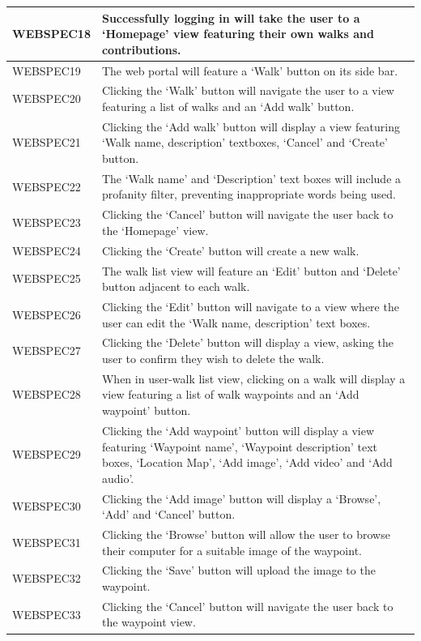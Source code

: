 \documentclass[11pt,a4paper]{article}
\begin{document}
\begin{longtable}{|p{2.5cm}p{13cm}|}
WEBSPEC18 & Successfully logging in will take the user to a `Homepage' view featuring their own walks and contributions. \\ \hline
WEBSPEC19 & The web portal will feature a `Walk' button on its side bar. \\ \hline
WEBSPEC20 & Clicking the `Walk' button will navigate the user to a view featuring a list of walks and an `Add walk' button. \\ \hline
WEBSPEC21 & Clicking the `Add walk' button will display a view featuring `Walk name, description' textboxes, `Cancel' and `Create' button. \\ \hline
WEBSPEC22 & The `Walk name' and `Description' text boxes will include a profanity filter, preventing inappropriate words being used. \\ \hline
WEBSPEC23 & Clicking the `Cancel' button will navigate the user back to the `Homepage' view. \\ \hline
WEBSPEC24 & Clicking the `Create' button will create a new walk. \\ \hline
WEBSPEC25 & The walk list view will feature an `Edit' button and `Delete' button adjacent to each walk. \\ \hline
WEBSPEC26 & Clicking the `Edit' button will navigate to a view where the user can edit the `Walk name, description' text boxes. \\ \hline
WEBSPEC27 & Clicking the `Delete' button will display a view, asking the user to confirm they wish to delete the walk. \\ \hline
WEBSPEC28 & When in user-walk list view, clicking on a walk will display a view featuring a list of walk waypoints and an `Add waypoint' button. \\ \hline
WEBSPEC29 & Clicking the `Add waypoint' button will display a view featuring `Waypoint name', `Waypoint description' text boxes, `Location Map', `Add image', `Add video' and `Add audio'. \\ \hline
WEBSPEC30 & Clicking the `Add image' button will display a `Browse', `Add' and `Cancel' button. \\ \hline
WEBSPEC31 & Clicking the `Browse' button will allow the user to browse their computer for a suitable image of the waypoint. \\ \hline
WEBSPEC32 & Clicking the `Save' button will upload the image to the waypoint. \\ \hline
WEBSPEC33 & Clicking the `Cancel' button will navigate the user back to the waypoint view. \\ \hline

\end{longtable}
\end{document}
